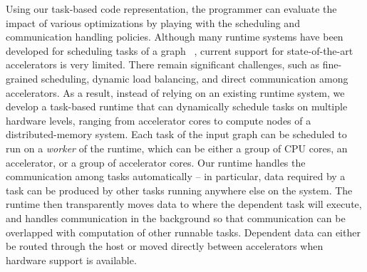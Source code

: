 Using our task-based code representation, the programmer can evaluate the impact of various optimizations by playing with the scheduling and communication handling policies.
Although many runtime systems have been developed for scheduling tasks of a graph ~\cite{legion,physics,mpiacc,mvapich2gpu}, current support for state-of-the-art accelerators is very limited.
There remain significant challenges, such as fine-grained scheduling, dynamic load balancing, and direct communication among accelerators.
As a result, instead of relying on an existing runtime system,  we develop a task-based runtime that can dynamically schedule tasks on multiple hardware levels, ranging from accelerator cores to compute nodes of a distributed-memory system.
Each task of the input graph can be scheduled to run on a {\em worker} of the runtime, which can be either a group of CPU cores, an accelerator, or a group of accelerator cores.
Our runtime handles the communication among tasks automatically -- in particular, data required by a task can be produced by other tasks running anywhere else on the system.
The runtime then transparently moves data to where the dependent task will execute, and handles communication in the background so that communication can be overlapped with computation of other runnable tasks.
Dependent data can either be routed through the host or moved directly between accelerators when hardware support is available.

